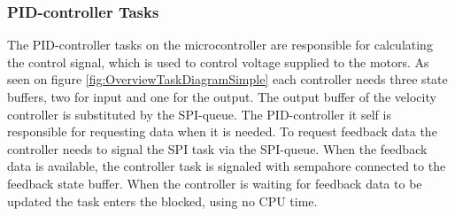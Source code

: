 \documentclass[../../main.tex]{subfiles}
\begin{document}




\subsubsection*{PID-controller Tasks}
The PID-controller tasks on the microcontroller are responsible for calculating the control signal, which is used to control voltage supplied to the motors. As seen on figure \ref{fig:OverviewTaskDiagramSimple} each controller needs three state buffers, two for input and one for the output. The output buffer of the velocity controller is substituted by the SPI-queue. The PID-controller it self is responsible for requesting data when it is needed. To request feedback data the controller needs to signal the SPI task via the SPI-queue. When the feedback data is available, the controller task is signaled with sempahore connected to the feedback state buffer. When the controller is waiting for feedback data to be updated the task enters the blocked, using no CPU time. 
\end{document}
